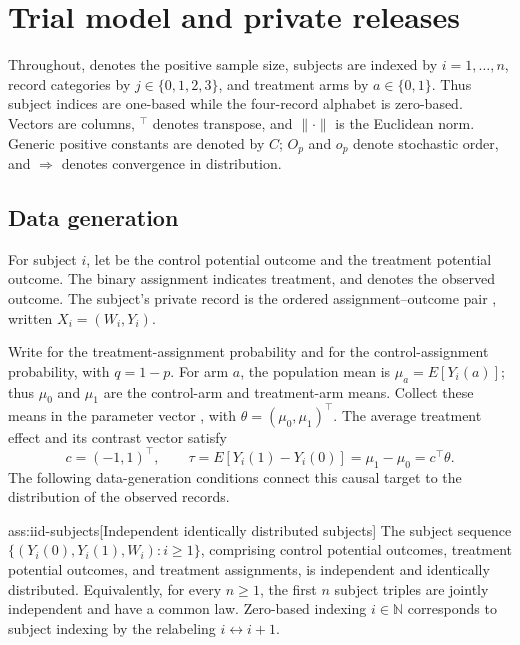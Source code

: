 \section{Trial model and private releases}

Throughout,  denotes the positive sample size, subjects are indexed by \(i=1,\ldots,n\), record categories by \(j\in\{0,1,2,3\}\), and treatment arms by \(a\in\{0,1\}\). Thus subject indices are one-based while the four-record alphabet is zero-based. Vectors are columns, \({}^{\top}\) denotes transpose, and \(\|\cdot\|\) is the Euclidean norm. Generic positive constants are denoted by \(C\); \(O_p\) and \(o_p\) denote stochastic order, and \(\Rightarrow\) denotes convergence in distribution.

\subsection{Data generation}

For subject \(i\), let  be the control potential outcome and  the treatment potential outcome. The binary assignment  indicates treatment, and  denotes the observed outcome. The subject's private record is the ordered assignment--outcome pair , written \(X_i=(W_i,Y_i)\).

Write  for the treatment-assignment probability and  for the control-assignment probability, with \(q=1-p\). For arm \(a\), the population mean  is \(\mu_a=E[Y_i(a)]\); thus \(\mu_0\) and \(\mu_1\) are the control-arm and treatment-arm means. Collect these means in the parameter vector , with \(\theta=(\mu_0,\mu_1)^\top\). The average treatment effect  and its contrast vector  satisfy
\[
c=(-1,1)^\top,
\qquad
\tau=E[Y_i(1)-Y_i(0)]=\mu_1-\mu_0=c^\top\theta.
\]
The following data-generation conditions connect this causal target to the distribution of the observed records.

\begin{assumptionv}{ass:iid-subjects}[Independent identically distributed subjects]
The subject sequence \(\{(Y_i(0),Y_i(1),W_i):i\ge1\}\), comprising control potential outcomes, treatment potential outcomes, and treatment assignments, is independent and identically distributed. Equivalently, for every \(n\ge1\), the first \(n\) subject triples are jointly independent and have a common law. Zero-based indexing \(i\in\mathbb N\) corresponds to subject indexing by the relabeling \(i\leftrightarrow i+1\).
\end{assumptionv}

